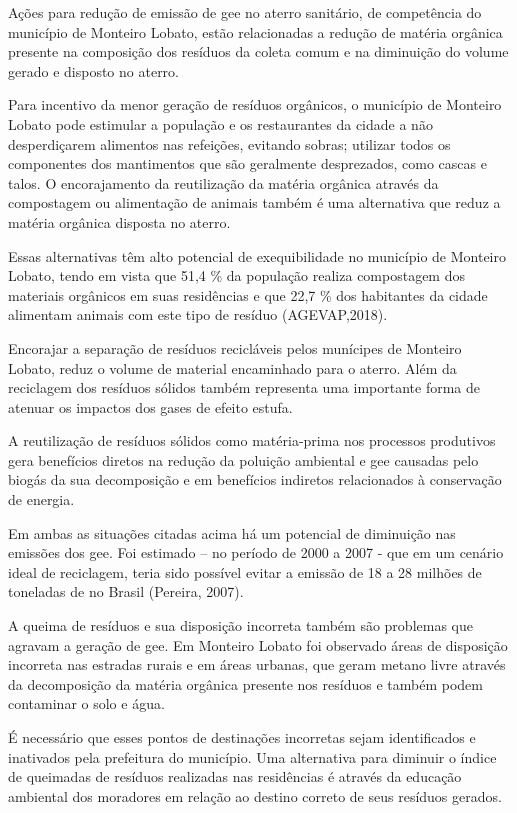 Ações para redução de emissão de \gls{gee} no aterro sanitário, de competência do município de Monteiro Lobato, estão relacionadas a redução de matéria orgânica presente na composição dos resíduos da coleta comum e na diminuição do volume gerado e disposto no aterro. 

Para incentivo da menor geração de resíduos orgânicos, o município de Monteiro Lobato pode estimular a população e os restaurantes da cidade a não desperdiçarem alimentos nas refeições, evitando sobras; utilizar todos os componentes dos mantimentos que são geralmente desprezados, como cascas e talos. O encorajamento da reutilização da matéria orgânica através da compostagem ou alimentação de animais também é uma alternativa que reduz a matéria orgânica disposta no aterro.

Essas alternativas têm alto potencial de exequibilidade no município de Monteiro Lobato, tendo em vista que 51,4 \% da população realiza compostagem dos materiais orgânicos em suas residências e que 22,7 \% dos habitantes da cidade alimentam animais com este tipo de resíduo (AGEVAP,2018).

Encorajar a separação de resíduos recicláveis pelos munícipes de Monteiro Lobato, reduz o volume de material encaminhado para o aterro. Além da reciclagem dos resíduos sólidos também representa uma importante forma de atenuar os impactos dos gases de efeito estufa. 

A reutilização de resíduos sólidos como matéria-prima nos processos produtivos gera benefícios diretos na redução da poluição ambiental e \gls{gee} causadas pelo biogás da sua decomposição e em benefícios indiretos relacionados à conservação de energia. 

Em ambas as situações citadas acima há um potencial de diminuição nas emissões dos \gls{gee}. Foi estimado – no período de 2000 a 2007 - que em um cenário ideal de reciclagem, teria sido possível evitar a emissão de 18 a 28 milhões de toneladas de  no Brasil (Pereira, 2007). 

A queima de resíduos e sua disposição incorreta também são problemas que agravam a geração de \gls{gee}. Em Monteiro Lobato foi observado áreas de disposição incorreta nas estradas rurais e em áreas urbanas, que geram metano livre através da decomposição da matéria orgânica presente nos resíduos e também podem contaminar o solo e água. 

É necessário que esses pontos de destinações incorretas sejam identificados e inativados pela prefeitura do município. Uma alternativa para diminuir o índice de queimadas de resíduos realizadas nas residências é através da educação ambiental dos moradores em relação ao destino correto de seus resíduos gerados.  

